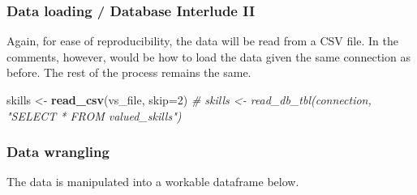 \documentclass[]{article}
\newenvironment{Shaded}{\begin{snugshade}}{\end{snugshade}}
\newcommand{\CommentTok}[1]{\textcolor[rgb]{0.56,0.35,0.01}{\textit{#1}}}
\newcommand{\DataTypeTok}[1]{\textcolor[rgb]{0.13,0.29,0.53}{#1}}
\newcommand{\DecValTok}[1]{\textcolor[rgb]{0.00,0.00,0.81}{#1}}
\newcommand{\KeywordTok}[1]{\textcolor[rgb]{0.13,0.29,0.53}{\textbf{#1}}}
\newcommand{\NormalTok}[1]{#1}
\newcommand{\StringTok}[1]{\textcolor[rgb]{0.31,0.60,0.02}{#1}}
\begin{document}
\hypertarget{data-loading-database-interlude-ii}{%
\subsubsection{Data loading / Database Interlude
II}\label{data-loading-database-interlude-ii}}

Again, for ease of reproducibility, the data will be read from a CSV
file. In the comments, however, would be how to load the data given the
same connection as before. The rest of the process remains the same.

\begin{Shaded}
\begin{Highlighting}[]
\NormalTok{skills <-}\StringTok{ }\KeywordTok{read_csv}\NormalTok{(vs_file, }\DataTypeTok{skip=}\DecValTok{2}\NormalTok{)}
\CommentTok{# skills <- read_db_tbl(connection, "SELECT * FROM valued_skills")}
\end{Highlighting}
\end{Shaded}

\hypertarget{data-wrangling-1}{%
\subsubsection{Data wrangling}\label{data-wrangling-1}}

The data is manipulated into a workable dataframe below.
\end{document}
